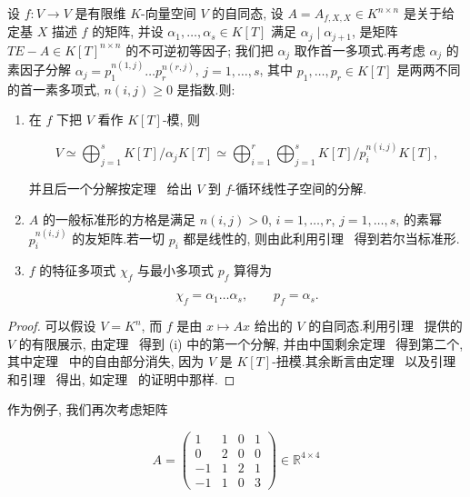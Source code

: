\begin{bigtheorem}\label{bigthm:6.5.18}
设 $f \colon V \longrightarrow V$ 是有限维 $K$-向量空间 $V$ 的自同态, 设 $A = A_{f, X, X} \in K^{n \times n}$ 是关于给定基 $X$ 描述 $f$ 的矩阵, 并设 $\alpha_1, \ldots, \alpha_s \in K[T]$ 满足 $\alpha_j \mid \alpha_{j + 1}$, 是矩阵 $TE - A \in K[T]^{n \times n}$ 的不可逆初等因子; 我们把 $\alpha_j$ 取作首一多项式.再考虑 $\alpha_j$ 的素因子分解 $\alpha_j = p_1^{n(1, j)} \ldots p_r^{n(r, j)}$, $j = 1, \ldots, s$, 其中 $p_1, \ldots, p_r \in K[T]$ 是两两不同的首一素多项式, $n(i, j) \geq 0$ 是指数.则:
\begin{enumerate}
\item[(i)] 在 $f$ 下把 $V$ 看作 $K[T]$-模, 则

\[
V \simeq \bigoplus_{j = 1}^{s} K[T]/\alpha_j K[T] \simeq \bigoplus_{i = 1}^{r} \bigoplus_{j = 1}^{s} K[T]/p_i^{n(i, j)} K[T],\]

并且后一个分解按定理~ 给出 $V$ 到 $f$-循环线性子空间的分解.
\item[(ii)] $A$ 的一般标准形的方格是满足 $n(i, j) > 0$, $i = 1, \ldots, r$, $j = 1, \ldots, s$, 的素幂 $p_i^{n(i, j)}$ 的友矩阵.若一切 $p_i$ 都是线性的, 则由此利用引理~ 得到若尔当标准形.
\item[(iii)] $f$ 的特征多项式 $\chi_f$ 与最小多项式 $p_f$ 算得为

\[
\chi_f = \alpha_1 \ldots \alpha_s, \qquad p_f = \alpha_s\text{.}\]
\end{enumerate}
\end{bigtheorem}

\begin{proof}
可以假设 $V = K^n$, 而 $f$ 是由 $x \longmapsto Ax$ 给出的 $V$ 的自同态.利用引理~ 提供的 $V$ 的有限展示, 由定理~ 得到 (i) 中的第一个分解, 并由中国剩余定理~ 得到第二个, 其中定理~ 中的自由部分消失, 因为 $V$ 是 $K[T]$-扭模.其余断言由定理~ 以及引理~ 和引理~ 得出, 如定理~ 的证明中那样.
\end{proof}

作为例子, 我们再次考虑矩阵

\[
A = \left(\begin{array}{cccc} 1 & 1 & 0 & 1 \\ 0 & 2 & 0 & 0 \\ -1 & 1 & 2 & 1 \\ -1 & 1 & 0 & 3 \end{array}\right) \in \mathbb{R}^{4 \times 4}\]

